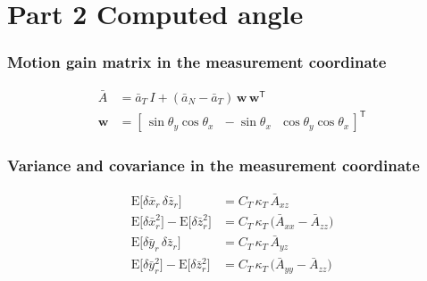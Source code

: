 \documentclass[11pt,a4paper]{ctexart}
\newcommand{\setline}[1]{\noindent{\small\textcolor[gray]{0.35}{#1}}\par\smallskip}
\newcommand{\ba}{\bar{a}}
\newcommand{\bx}{\bar{x}}
\newcommand{\bz}{\bar{z}}
\newcommand{\thy}{\theta_y}
\newcommand{\CK}{C_T\,\kappa_T}
\newcommand{\E}{\mathrm{E}}
\newcommand{\Ab}{\bar{A}}
\begin{document}
\clearpage
\part*{Part 2 \quad Computed angle}
\setcounter{section}{0}

\section{Motion gain matrix in the measurement coordinate}
\begin{align*}
\Ab &= \ba_T\,I + (\ba_N - \ba_T)\,\mathbf w\,\mathbf w^{\mathsf T} \\
\mathbf w &= [\,\sin\thy\cos\theta_x\ \ \ -\sin\theta_x\ \ \ \cos\thy\cos\theta_x\,]^{\mathsf T}
\end{align*}

\section{Variance and covariance in the measurement coordinate}
\setline{sensor noise taken equal on $x$, $y$ and $z$}
\begin{align*}
\E\big[\delta\bx_r\,\delta\bz_r\big] &= \CK\,\Ab_{xz} \\
\E\big[\delta\bx_r^2\big] - \E\big[\delta\bz_r^2\big] &= \CK\,\big(\Ab_{xx} - \Ab_{zz}\big) \\
\E\big[\delta\bar y_r\,\delta\bz_r\big] &= \CK\,\Ab_{yz} \\
\E\big[\delta\bar y_r^2\big] - \E\big[\delta\bz_r^2\big] &= \CK\,\big(\Ab_{yy} - \Ab_{zz}\big)
\end{align*}
\end{document}
